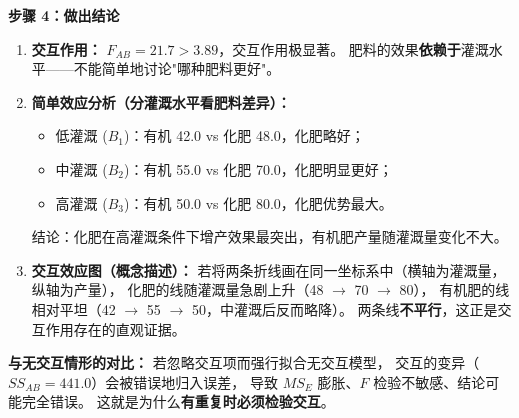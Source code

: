 \begin{example}
\textbf{步骤 4：做出结论}

\begin{enumerate}
    \item \textbf{交互作用：} $F_{AB} = 21.7 > 3.89$，交互作用极显著。
    肥料的效果\textbf{依赖于}灌溉水平——不能简单地讨论"哪种肥料更好"。

    \item \textbf{简单效应分析（分灌溉水平看肥料差异）：}
    \begin{itemize}
        \item 低灌溉 ($B_1$)：有机 42.0 vs 化肥 48.0，化肥略好；
        \item 中灌溉 ($B_2$)：有机 55.0 vs 化肥 70.0，化肥明显更好；
        \item 高灌溉 ($B_3$)：有机 50.0 vs 化肥 80.0，化肥优势最大。
    \end{itemize}
    结论：化肥在高灌溉条件下增产效果最突出，有机肥产量随灌溉量变化不大。

    \item \textbf{交互效应图（概念描述）：}
    若将两条折线画在同一坐标系中（横轴为灌溉量，纵轴为产量），
    化肥的线随灌溉量急剧上升（48 $\to$ 70 $\to$ 80），
    有机肥的线相对平坦（42 $\to$ 55 $\to$ 50，中灌溉后反而略降）。
    两条线\textbf{不平行}，这正是交互作用存在的直观证据。
\end{enumerate}

\textbf{与无交互情形的对比：} 若忽略交互项而强行拟合无交互模型，
交互的变异（$SS_{AB}=441.0$）会被错误地归入误差，
导致 $MS_E$ 膨胀、$F$ 检验不敏感、结论可能完全错误。
这就是为什么\textbf{有重复时必须检验交互}。
\end{example}

